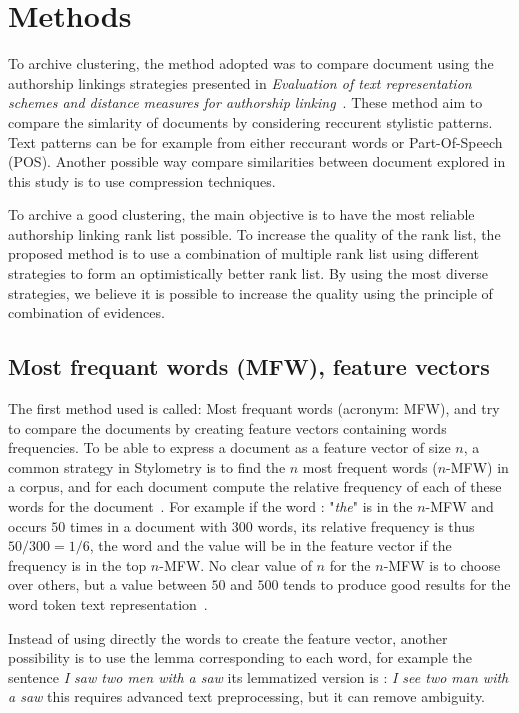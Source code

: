 \section{Methods \label{sec:methods}}

To archive clustering, the method adopted was to compare document using the authorship linkings strategies presented in \textit{Evaluation of text representation schemes and distance measures for authorship linking}~\cite{kocher_verification}.
These method aim to compare the simlarity of documents by considering reccurent stylistic patterns.
Text patterns can be for example from either reccurant words or Part-Of-Speech (POS).
Another possible way compare similarities between document explored in this study is to use compression techniques.

To archive a good clustering, the main objective is to have the most reliable authorship linking rank list possible.
To increase the quality of the rank list, the proposed method is to use a combination of multiple rank list using different strategies to form an optimistically better rank list.
By using the most diverse strategies, we believe it is possible to increase the quality using the principle of combination of evidences.

\subsection{Most frequant words (MFW), feature vectors}

The first method used is called: Most frequant words (acronym: MFW), and try to compare the documents by creating feature vectors containing words frequencies.
To be able to express a document as a feature vector of size $n$, a common strategy in Stylometry is to find the $n$ most frequent words ($n$-MFW) in a corpus, and for each document compute the relative frequency of each of these words for the document~\cite{savoy_stylo}.
For example if the word : "\textit{the}" is in the $n$-MFW and occurs $50$ times in a document with $300$ words, its relative frequency is thus $50/300 = 1/6$, the word and the value will be in the feature vector if the frequency is in the top $n$-MFW.
No clear value of $n$ for the $n$-MFW is to choose over others, but a value between $50$ and $500$ tends to produce good results for the word token text representation~\cite{savoy_text_representation}.

Instead of using directly the words to create the feature vector, another possibility is to use the lemma corresponding to each word, for example the sentence \textit{I saw two men with a saw} its lemmatized version is : \textit{I see two man with a saw} this requires advanced text preprocessing, but it can remove ambiguity.


